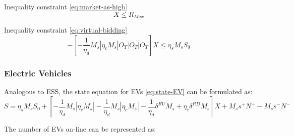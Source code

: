Inequality constraint \eqref{eq:market-as-high}
\begin{equation*}
[O_T | O_T | O_T | O_T | I_T]X \leq R_{Max}
\end{equation*}

Inequality constraint \eqref{eq:virtual-bidding}
\begin{equation*}
-[-\frac{1}{\eta_d}M_s | \eta_c M_s| O_T | O_T | O_T]X \leq \eta_s M_s S_0
\end{equation*}

\subsubsection{Electric Vehicles}

Analogous to ESS, the state equation for EVs \eqref{eq:state-EV} can be formulated as:
\begin{equation*}
S = \eta_s M_s S_0 + [-\frac{1}{\eta_d}M_s | \eta_c M_s | -\frac{1}{\eta_d}M_s | \eta_c M_s | -\frac{1}{\eta_d}  \delta^{RU} M_s + \eta_c \delta^{RD} M_s ] X  + M_s s^+ N^+ - M_s s^- N^-
\end{equation*}

The number of EVs on-line can be represented as:

